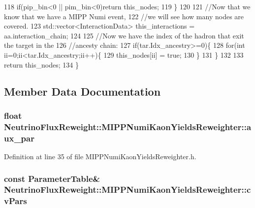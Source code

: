 \begin{DoxyCode}
118       \textcolor{keywordflow}{if}(pip\_bin<0 || pim\_bin<0)\textcolor{keywordflow}{return} this\_nodes;
119     \}
120     
121     \textcolor{comment}{//Now that we know that we have a MIPP Numi event, }
122     \textcolor{comment}{//we will see how many nodes are covered.}
123     std::vector<InteractionData> this\_interactions = aa.interaction\_chain; 
124     
125     \textcolor{comment}{//Now we have the index of the hadron that exit the target in the }
126     \textcolor{comment}{//ancesty chain:}
127     \textcolor{keywordflow}{if}(tar.Idx\_ancestry>=0)\{
128       \textcolor{keywordflow}{for}(\textcolor{keywordtype}{int} ii=0;ii<tar.Idx\_ancestry;ii++)\{
129         this\_nodes[ii] = \textcolor{keyword}{true};
130       \}
131     \}
132     
133     \textcolor{keywordflow}{return} this\_nodes;
134   \}
\end{DoxyCode}


\subsection{Member Data Documentation}
\hypertarget{class_neutrino_flux_reweight_1_1_m_i_p_p_numi_kaon_yields_reweighter_a834bede67f164f8a08d50bd15f8ef02c}{
\subsubsection[{aux\-\_\-par}]{\setlength{\rightskip}{0pt plus 5cm}float Neutrino\-Flux\-Reweight\-::\-M\-I\-P\-P\-Numi\-Kaon\-Yields\-Reweighter\-::aux\-\_\-par\hspace{0.3cm}{\ttfamily [private]}}}\label{class_neutrino_flux_reweight_1_1_m_i_p_p_numi_kaon_yields_reweighter_a834bede67f164f8a08d50bd15f8ef02c}


Definition at line 35 of file M\-I\-P\-P\-Numi\-Kaon\-Yields\-Reweighter.\-h.

\hypertarget{class_neutrino_flux_reweight_1_1_m_i_p_p_numi_kaon_yields_reweighter_a39b091512948ed98beae0d341efa6d23}{
\subsubsection[{cv\-Pars}]{\setlength{\rightskip}{0pt plus 5cm}const {\bf Parameter\-Table}\& Neutrino\-Flux\-Reweight\-::\-M\-I\-P\-P\-Numi\-Kaon\-Yields\-Reweighter\-::cv\-Pars}}\label{class_neutrino_flux_reweight_1_1_m_i_p_p_numi_kaon_yields_reweighter_a39b091512948ed98beae0d341efa6d23}


